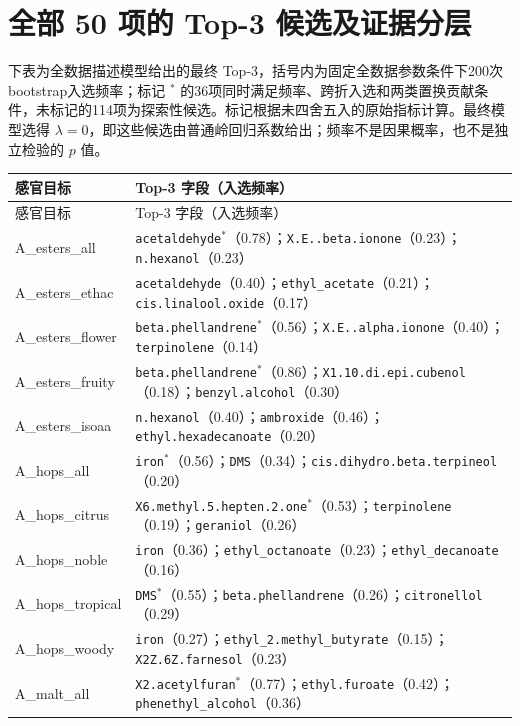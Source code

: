 \section{全部 50 项的 Top-3 候选及证据分层}
\label{app:top3}

下表为全数据描述模型给出的最终 Top-3，括号内为固定全数据参数条件下200次bootstrap入选频率；标记 $^{\ast}$ 的36项同时满足频率、跨折入选和两类置换贡献条件，未标记的114项为探索性候选。标记根据未四舍五入的原始指标计算。最终模型选得 $\lambda=0$，即这些候选由普通岭回归系数给出；频率不是因果概率，也不是独立检验的 $p$ 值。

\begin{longtable}{L{0.30\columnwidth}L{0.62\columnwidth}}
\toprule
感官目标 & Top-3 字段（入选频率） \\
\midrule
\endfirsthead
\toprule
感官目标 & Top-3 字段（入选频率） \\
\midrule
\endhead
\bottomrule
\endfoot
A\_esters\_all & \texttt{acetaldehyde}$^{\ast}$（0.78）；\texttt{X.E..beta.ionone}（0.23）；\texttt{n.hexanol}（0.23） \\
A\_esters\_ethac & \texttt{acetaldehyde}（0.40）；\texttt{ethyl\_acetate}（0.21）；\texttt{cis.linalool.oxide}（0.17） \\
A\_esters\_flower & \texttt{beta.phellandrene}$^{\ast}$（0.56）；\texttt{X.E..alpha.ionone}（0.40）；\texttt{terpinolene}（0.14） \\
A\_esters\_fruity & \texttt{beta.phellandrene}$^{\ast}$（0.86）；\texttt{X1.10.di.epi.cubenol}（0.18）；\texttt{benzyl.alcohol}（0.30） \\
A\_esters\_isoaa & \texttt{n.hexanol}（0.40）；\texttt{ambroxide}（0.46）；\texttt{ethyl.hexadecanoate}（0.20） \\
A\_hops\_all & \texttt{iron}$^{\ast}$（0.56）；\texttt{DMS}（0.34）；\texttt{cis.dihydro.beta.terpineol}（0.20） \\
A\_hops\_citrus & \texttt{X6.methyl.5.hepten.2.one}$^{\ast}$（0.53）；\texttt{terpinolene}（0.19）；\texttt{geraniol}（0.26） \\
A\_hops\_noble & \texttt{iron}（0.36）；\texttt{ethyl\_octanoate}（0.23）；\texttt{ethyl\_decanoate}（0.16） \\
A\_hops\_tropical & \texttt{DMS}$^{\ast}$（0.55）；\texttt{beta.phellandrene}（0.26）；\texttt{citronellol}（0.29） \\
A\_hops\_woody & \texttt{iron}（0.27）；\texttt{ethyl\_2.methyl\_butyrate}（0.15）；\texttt{X2Z.6Z.farnesol}（0.23） \\
A\_malt\_all & \texttt{X2.acetylfuran}$^{\ast}$（0.77）；\texttt{ethyl.furoate}（0.42）；\texttt{phenethyl\_alcohol}（0.36） \\

\end{longtable}
